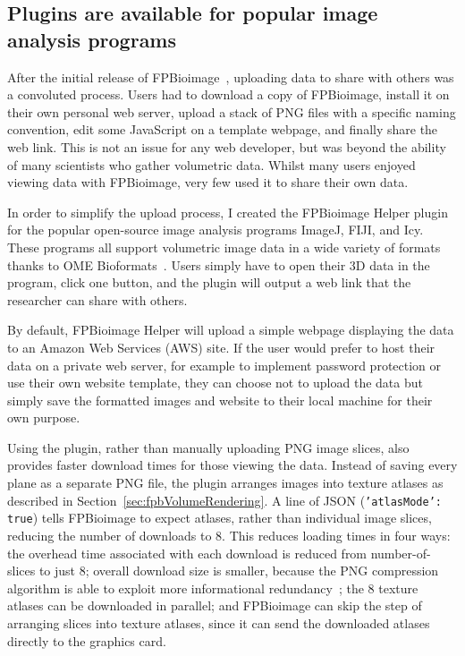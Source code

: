 \subsection{Plugins are available for popular image analysis programs}
After the initial release of FPBioimage~\cite{fantham2017new}, uploading data to share with others was a convoluted process. 
Users had to download a copy of FPBioimage, install it on their own personal web server, upload a stack of PNG files with a specific naming convention, edit some JavaScript on a template webpage, and finally share the web link. 
This is not an issue for any web developer, but was beyond the ability of many scientists who gather volumetric data. 
Whilst many users enjoyed viewing data with FPBioimage, very few used it to share their own data.

In order to simplify the upload process, I created the FPBioimage Helper plugin for the popular open-source image analysis programs ImageJ, FIJI, and Icy. 
These programs all support volumetric image data in a wide variety of formats thanks to OME Bioformats~\cite{linkert2010metadata}. 
Users simply have to open their 3D data in the program, click one button, and the plugin will output a web link that the researcher can share with others. 

By default, FPBioimage Helper will upload a simple webpage displaying the data to an Amazon Web Services (AWS) site.
If the user would prefer to host their data on a private web server, for example to implement password protection or use their own website template, they can choose not to upload the data but simply save the formatted images and website to their local machine for their own purpose. 

Using the plugin, rather than manually uploading PNG image slices, also provides faster download times for those viewing the data.
Instead of saving every plane as a separate PNG file, the plugin arranges images into texture atlases as described in Section~\ref{sec:fpbVolumeRendering}. 
A line of JSON (\texttt{'atlasMode': true}) tells FPBioimage to expect atlases, rather than individual image slices, reducing the number of downloads to 8. 
This reduces loading times in four ways: the overhead time associated with each download is reduced from number-of-slices to just 8; overall download size is smaller, because the PNG compression algorithm is able to exploit more informational redundancy~\cite[\textit{ch. 1}]{jayaraman2011digital}; the 8 texture atlases can be downloaded in parallel; and FPBioimage can skip the step of arranging slices into texture atlases, since it can send the downloaded atlases directly to the graphics card. 

